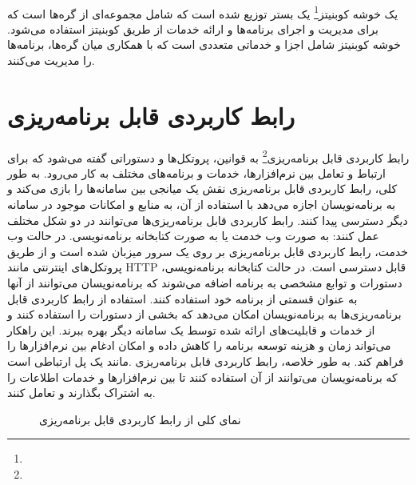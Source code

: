 \paragraph{}
{
    یک خوشه کوبنیتز\footnote{} یک بستر توزیع شده است که شامل مجموعه‌ای از گره‌ها است که برای مدیریت و اجرای برنامه‌ها و ارائه خدمات از طریق کوبنیتز استفاده می‌شود. خوشه کوبنیتز شامل اجزا و خدماتی متعددی است که با همکاری میان گره‌ها، برنامه‌ها را مدیریت می‌کنند.
}

\section{رابط کاربردی قابل برنامه‌ریزی}
\label{sec:api}
\paragraph{}
{
    رابط کاربردی قابل برنامه‌ریزی\footnote{} به قوانین، پروتکل‌ها و دستوراتی گفته می‌شود که برای ارتباط و 
    تعامل بین نرم‌افزارها، خدمات و برنامه‌های مختلف به کار می‌رود. به طور کلی، رابط کاربردی قابل برنامه‌ریزی نقش یک میانجی بین سامانه‌ها را بازی
    می‌کند و به برنامه‌نویسان اجازه می‌دهد با استفاده از آن، به منابع و امکانات موجود در سامانه دیگر دسترسی پیدا کنند. رابط کاربردی قابل برنامه‌ریزی‌ها
    می‌توانند در دو شکل مختلف عمل کنند: به صورت وب خدمت یا به صورت کتابخانه برنامه‌نویسی. در حالت وب خدمت، رابط کاربردی قابل برنامه‌ریزی بر روی
    یک سرور میزبان شده است و از طریق پروتکل‌های اینترنتی مانند HTTP قابل دسترسی است. در حالت کتابخانه برنامه‌نویسی، دستورات و توابع مشخصی به
    برنامه اضافه می‌شوند که برنامه‌نویسان می‌توانند از آنها به عنوان قسمتی از برنامه خود استفاده کنند. استفاده از رابط کاربردی قابل برنامه‌ریزی‌ها
    به برنامه‌نویسان امکان می‌دهد که بخشی از دستورات را استفاده کنند و از خدمات و قابلیت‌های ارائه شده توسط یک سامانه دیگر بهره ببرند. این 
    راهکار می‌تواند زمان و هزینه توسعه برنامه را کاهش داده و امکان ادغام بین نرم‌افزارها را فراهم کند. به طور خلاصه، رابط کاربردی قابل برنامه‌ریزی
    .مانند یک پل ارتباطی است که برنامه‌نویسان می‌توانند از آن استفاده کنند تا بین نرم‌افزارها و خدمات اطلاعات را به اشتراک بگذارند و تعامل کنند.
    \begin{figure}[H]
        \caption{نمای کلی از رابط کاربردی قابل برنامه‌ریزی}
        \label{fig:api}
    \end{figure}
}

